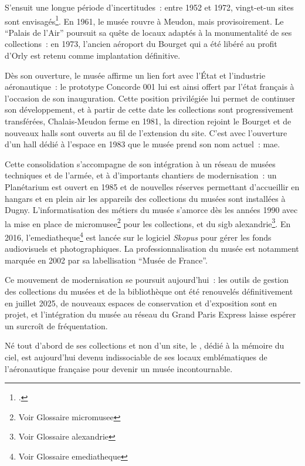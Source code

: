 S'ensuit une longue période d'incertitudes~: entre 1952 et 1972, vingt-et-un sites sont envisagés\footcite{terrierAeroportParisBourget2019}. En 1961, le musée rouvre à Meudon, mais provisoirement. Le \enquote{Palais de l'Air} poursuit sa quête de locaux adaptés à la monumentalité de ses collections~: en 1973, l'ancien aéroport du Bourget qui a été libéré au profit d'Orly est retenu comme implantation définitive.

Dès son ouverture, le musée affirme un lien fort avec l’État et l’industrie aéronautique~: le prototype Concorde 001 lui est ainsi offert par l'état français à l'occasion de son inauguration. Cette position privilégiée lui permet de continuer son développement, et à partir de cette date les collections sont progressivement transférées, Chalais-Meudon ferme en 1981, la direction rejoint le Bourget et de nouveaux halls sont ouverts au fil de l’extension du site. C'est avec l'ouverture d'un hall dédié à l'espace en 1983 que le musée prend son nom actuel~: \acf{mae}.

Cette consolidation s’accompagne de son intégration à un réseau de musées techniques et de l'armée, et à d'importants chantiers de modernisation~: un Planétarium est ouvert en 1985 et de nouvelles réserves permettant d'accueillir en hangars et en plein air les appareils des collections du musées sont installées à Dugny. L'informatisation des métiers du musée s'amorce dès les années 1990 avec la mise en place de \gls{micromusee}\footnote{Voir Glossaire \gls{micromusee}} pour les collections, et du \ac{sigb} \gls{alexandrie}\footnote{Voir Glossaire \gls{alexandrie}}. En 2016, l’\gls{emediatheque}\footnote{Voir Glossaire \gls{emediatheque}} est lancée sur le logiciel \textit{Skopus} pour gérer les fonds audiovisuels et photographiques. La professionnalisation du musée est notamment marquée en 2002 par sa labellisation \enquote{Musée de France}. 

Ce mouvement de modernisation se poursuit aujourd’hui~: les outils de gestion des collections du musées et de la bibliothèque ont été renouvelés définitivement en juillet 2025, de nouveaux espaces de conservation et d’exposition sont en projet, et l'intégration du musée au réseau du Grand Paris Express laisse espérer un surcroît de fréquentation.

Né tout d'abord de ses collections et non d'un site, le \mae, dédié à la mémoire du ciel, est aujourd'hui devenu indissociable de ses locaux emblématiques de l'aéronautique française pour devenir un musée incontournable.

